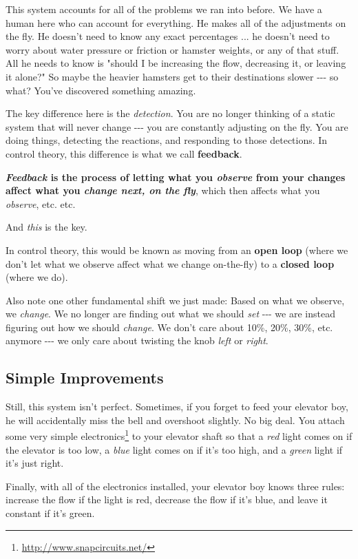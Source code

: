 \documentclass[]{article}
\renewcommand{\href}[2]{#2\footnote{\url{#1}}}
\begin{document}
This system accounts for all of the problems we ran into before. We have a human
here who can account for everything. He makes all of the adjustments on the fly.
He doesn't need to know any exact percentages ... he doesn't need to worry about
water pressure or friction or hamster weights, or any of that stuff. All he
needs to know is "should I be increasing the flow, decreasing it, or leaving it
alone?" So maybe the heavier hamsters get to their destinations slower -\/-\/-
so what? You've discovered something amazing.

The key difference here is the \emph{detection}. You are no longer thinking of a
static system that will never change -\/-\/- you are constantly adjusting on the
fly. You are doing things, detecting the reactions, and responding to those
detections. In control theory, this difference is what we call
\textbf{feedback}.

\textbf{\emph{Feedback} is the process of letting what you \emph{observe} from
your changes affect what you \emph{change next, on the fly}}, which then affects
what you \emph{observe}, etc. etc.

And \emph{this} is the key.

In control theory, this would be known as moving from an \textbf{open loop}
(where we don't let what we observe affect what we change on-the-fly) to a
\textbf{closed loop} (where we do).

Also note one other fundamental shift we just made: Based on what we observe, we
\emph{change}. We no longer are finding out what we should \emph{set} -\/-\/- we
are instead figuring out how we should \emph{change}. We don't care about 10\%,
20\%, 30\%, etc. anymore -\/-\/- we only care about twisting the knob
\emph{left} or \emph{right}.

\subsection{Simple Improvements}

Still, this system isn't perfect. Sometimes, if you forget to feed your elevator
boy, he will accidentally miss the bell and overshoot slightly. No big deal. You
attach some \href{http://www.snapcircuits.net/}{very simple electronics} to your
elevator shaft so that a \emph{red} light comes on if the elevator is too low, a
\emph{blue} light comes on if it's too high, and a \emph{green} light if it's
just right.

Finally, with all of the electronics installed, your elevator boy knows three
rules: increase the flow if the light is red, decrease the flow if it's blue,
and leave it constant if it's green.
\end{document}
